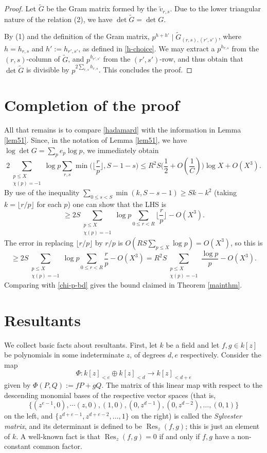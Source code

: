 \documentclass[11pt,reqno]{amsart}
\numberwithin{equation}{section}
\newcommand{\Res}{\operatorname{Res}}
\renewcommand{\le}{\leqslant}
\renewcommand{\ge}{\geqslant}
\begin{document}
\begin{proof}
Let $\tilde G$ be the Gram matrix formed by the $\tilde v_{r,s}$. Due to the lower triangular nature of the relation (2), we have $\det \tilde G = \det G$.

By (1) and the definition of the Gram matrix, $p^{h + h'} \mid \tilde G_{(r,s), (r', s')}$, where $h = h_{r,s}$ and $h' := h_{r',s'}$, as defined in \eqref{h-choice}. We may extract a $p^{h_{r,s}}$ from the $(r,s)$-column of $\tilde G$, and $p^{h_{r',s'}}$ from the $(r', s')$-row, and thus obtain that $\det \tilde G$ is divisible by $p^{2 \sum_{r,s} h_{r,s}}$. This concludes the proof.
\end{proof}

\section{Completion of the proof}

All that remains is to compare \eqref{hadamard} with the information in Lemma \ref{lem51}. Since, in the notation of Lemma \ref{lem51}, we have $\log \det G = \sum_p e_p \log p$, we immediately obtain 
\begin{equation}\label{chi-p-bd} 2 \sum_{\substack{p \le X \\ \chi(p) = -1}} \log p \sum_{r,s} \min\big( \lfloor \frac{r}{p}\rfloor, S - 1 - s\big) \le R^2 S \big(\frac{1}{2} + O(\frac{1}{C})\big) \log X  + O(X^3).\end{equation}
By use of the inequality $\sum_{0 \le s < S} \min(k, S -s - 1) \ge Sk - k^2$ (taking $k = \lfloor r/p\rfloor$ for each $p$) one can show that the LHS is 
\[ \ge 2S \sum_{\substack{p \le X \\ \chi(p) = -1}} \log p \sum_{0 \le r < R} \lfloor \frac{r}{p}\rfloor - O(X^3).\] The error in replacing $\lfloor r/p\rfloor$ by $r/p$ is $O( RS\sum_{p \le X} \log p) = O(X^3)$, so this is
\[ \ge 2S \sum_{\substack{p \le X \\ \chi(p) = -1}} \log p \sum_{0 \le r < R} \frac{r}{p} - O(X^3) = R^2S\sum_{\substack{p \le X \\ \chi(p) = -1}} \frac{\log p}{p} - O(X^3).\]
Comparing with \eqref{chi-p-bd} gives the bound claimed in Theorem \ref{mainthm}.

\appendix

\section{Resultants}\label{appA}

We collect basic facts about resultants. First, let $k$ be a field and let $f, g \in k[z]$ be polynomials in some indeterminate $z$, of degrees $d, e$ respectively. Consider the map
\[ \Phi : k[z]_{< e} \oplus k[z]_{< d} \rightarrow k[z]_{ < d + e}\] given by $\Phi(P, Q) := f P  + g Q$. The matrix of this linear map with respect to the descending monomial bases of the respective vector spaces (that is, \[ \{ (z^{e-1}, 0), \cdots (z, 0), (1, 0), (0, z^{d-1}), (0, z^{d-2}),\dots, (0,1)\}\]  on the left, and $\{ z^{d + e - 1},z^{d + e - 2},\dots, 1\}$ on the right) is called the \emph{Sylvester matrix}, and its determinant is defined to be $\Res_z (f, g)$; this is just an element of $k$. A well-known fact is that $\Res_z(f,g) = 0$ if and only if $f, g$ have a non-constant common factor.
\end{document}
